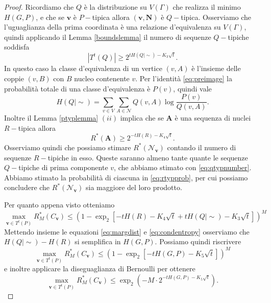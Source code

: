 \begin{proof}
	Ricordiamo che \(Q\) è la distribuzione su \(V(\Gamma)\) che realizza il minimo \(H(G,P)\), e che se \(\mathbf{v}\) è \(P-\)tipica allora \((\mathbf{v}, \mathbf{N})\) è \(Q-\)tipica. Osserviamo che l'uguaglianza della prima coordinata è una relazione d'equivalenza su \(V(\Gamma)\), quindi applicando il Lemma \ref{boundslemma} il numero di sequenze \(Q-\)tipiche soddisfa 
	\begin{equation}
		\label{eq:qtypnumber} \left\vert T^{t}(Q)\right\vert \ge 2^{tH(Q\mid\sim)-K_{3}\sqrt{t}}. 
	\end{equation}
	In questo caso la classe d'equivalenza di un vertice \((v,A)\) è l'insieme delle coppie \((v,B)\) con \(B\) nucleo contenente \(v\). Per l'identità \eqref{eq:preimage} la probabilità totale di una classe d'equivalenza è \(P(v)\), quindi vale 
	\begin{equation}
		\label{eq:condentropy} H(Q\mid\sim)=\sum_{v\in V} \sum_{A\in \mathcal{N}} Q(v,A)\log{\frac{P(v)}{Q(v,A)}}. 
	\end{equation}
	Inoltre il Lemma \ref{ptyplemma} \((ii)\) implica che se \(\mathbf{A}\) è una sequenza di nuclei \(R-\)tipica allora 
	\begin{equation}
		\label{eq:rtypprob} R^{*}(\mathbf{A})\ge 2^{-tH(R)-K_{4}\sqrt{t}}. 
	\end{equation}
	Osserviamo quindi che possiamo stimare \(R^{*}(\mathcal{N}_{\mathbf{v}})\) contando il numero di sequenze \(R-\)tipiche in esso. Queste saranno almeno tante quante le sequenze \(Q-\)tipiche di prima componente \(v\), che abbiamo stimato con \eqref{eq:qtypnumber}. Abbiamo stimato la probabilità di ciascuna in \eqref{eq:rtypprob}, per cui possiamo concludere che \(R^{*}(\mathcal{N}_{\mathbf{v}})\) sia maggiore del loro prodotto.
	
	Per quanto appena visto otteniamo 
	\begin{equation}
		\max_{\mathbf{v}\in T^t(P)} R_{M}^{*}(C_{\mathbf{v}})\le \left(1- \exp_{2}{\left[-tH(R) - K_{4}\sqrt{t} + tH(Q\mid\sim) - K_{3}\sqrt{t}\right]}\right)^{M} 
	\end{equation}
	Mettendo insieme le equazioni \eqref{eq:margdist} e \eqref{eq:condentropy} osserviamo che \(H(Q\mid\sim) - H(R)\) si semplifica in \(H(G,P)\). Possiamo quindi riscrivere
	\[\max_{\mathbf{v}\in T^t(P)} R_{M}^{*}(C_{\mathbf{v}})\le \left(1- \exp_{2}{\left[-tH(G,P) - K_{5}\sqrt{t}\right]}\right)^{M}\]
	e inoltre applicare la diseguaglianza di Bernoulli per ottenere
	\[\max_{\mathbf{v}\in T^t(P)} R_{M}^{*}(C_{\mathbf{v}})\le \exp_{2}\left(-M\cdot 2^{-tH(G,P) - K_{5}\sqrt{t}}\right).\]
	

\end{proof}
